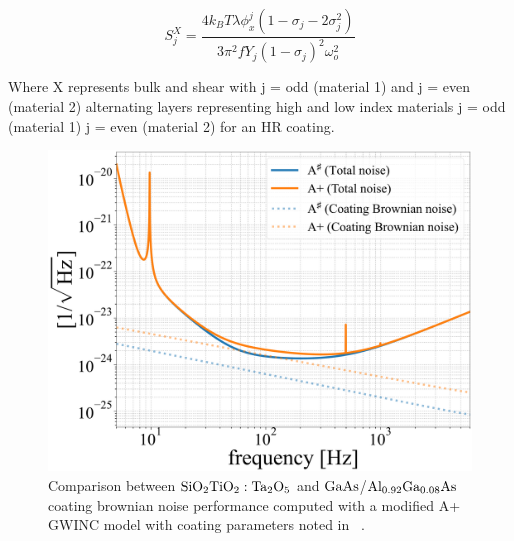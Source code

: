 \begin{equation}
S_j^X = \frac{4k_B T \lambda \phi_x^j(1- \sigma_j - 2 \sigma_j^2)}{3 \pi^2 f Y_j (1-\sigma_j)^2 \omega_o^2}
\end{equation}

\noindent Where X represents bulk and shear with j = odd (material 1) and j = even (material 2) alternating layers representing high and low index materials j = odd (material 1) j = even (material 2) for an HR coating.

\begin{figure}[H]
    \begin{center}
    \includegraphics[width=\textwidth]{code/gwinc/aplus_CTN_compare.pdf}
    \end{center}
\caption{Comparison between $\mathrm{SiO_2}\mathrm{TiO_2:Ta_2O_5}$ and $\mathrm{GaAs}$/$\mathrm{Al_{0.92}Ga_{0.08}As}$ coating brownian noise performance computed with a modified A+ GWINC model with coating parameters noted in ~\cite{dcc:asharp}.}
\label{fig:aligotncomp}
\end{figure}

